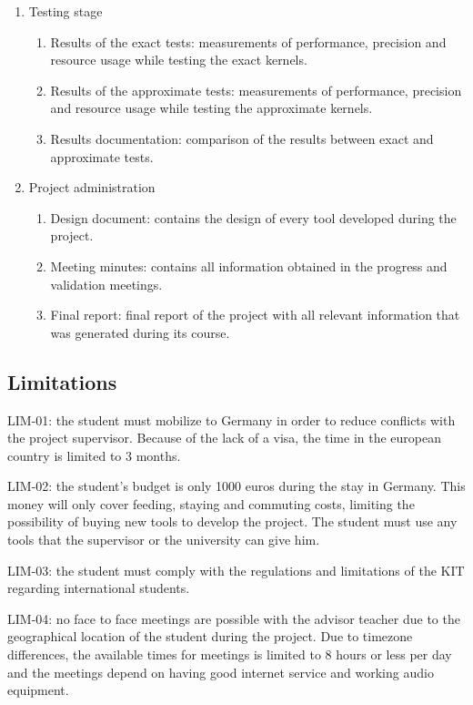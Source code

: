 \begin{enumerate}
    \item Testing stage
        \begin{enumerate}
            \item Results of the exact tests: measurements of performance, precision and resource usage while
            testing the exact kernels.
            \item Results of the approximate tests: measurements of performance, precision and resource usage while
            testing the approximate kernels.
            \item Results documentation: comparison of the results between exact and approximate tests.
        \end{enumerate}
    \item Project administration
        \begin{enumerate}
            \item Design document: contains the design of every tool developed during the project.
            \item Meeting minutes: contains all information obtained in the progress and validation
            meetings.
            \item Final report: final report of the project with all relevant information that was
            generated during its course.
        \end{enumerate}
    
\end{enumerate}

\subsection{Limitations}

LIM-01: the student must mobilize to Germany in order to reduce conflicts with the project supervisor.
Because of the lack of a visa, the time in the european country is limited to 3 months. 
 
LIM-02:​ the student's budget is only 1000 euros during the stay in Germany. This money will only cover feeding, staying and commuting costs,
limiting the possibility of buying new tools to develop the project. The student must use any tools that the supervisor or the university
can give him.

LIM-03: the student must comply with the regulations and limitations of the KIT regarding international
students.

LIM-04: no face to face meetings are possible with the advisor teacher due to the geographical location of 
the student during the project. Due to timezone differences, the available times for meetings is limited
to 8 hours or less per day and the meetings depend on having good internet service and working
audio equipment.

